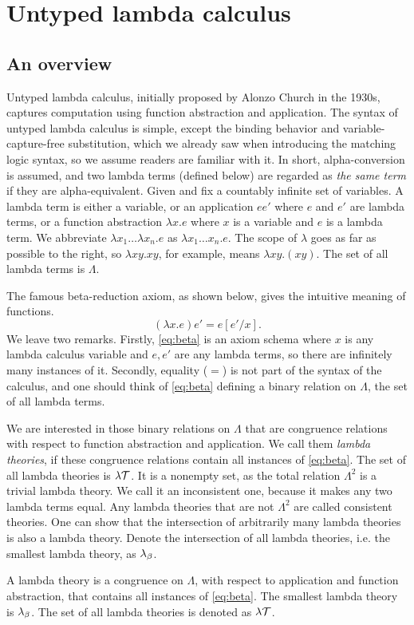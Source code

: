 \section{Untyped lambda calculus}

\subsection{An overview}

Untyped lambda calculus, initially proposed by Alonzo Church in the 1930s,
captures computation using function abstraction and application.
The syntax of untyped lambda calculus is simple,
except the binding behavior and variable-capture-free substitution,
which we already saw when introducing the matching logic syntax,
so we assume readers are familiar with it.
In short, alpha-conversion is assumed, and two lambda terms 
(defined below) are regarded as \emph{the same term} 
if they are alpha-equivalent.
Given and fix a countably infinite set of variables.
A lambda term is either a variable,
or an application $e e'$ where $e$ and $e'$ are lambda terms,
or a function abstraction $\lambda x . e$ 
where $x$ is a variable and $e$ is a lambda term.
We abbreviate $\lambda x_1 \dots \lambda x_n . e$ as
$\lambda x_1 \dots x_n . e$.
The scope of $\lambda$ goes as far as possible to the right,
so $\lambda x y . x y$, for example, means $\lambda x y . (x y)$.
The set of all lambda terms is $\Lambda$.

The famous beta-reduction axiom, as shown below,
gives the intuitive meaning of functions. 
\begin{equation}
\label{eq:beta}
\tag{$\beta$}
(\lambda x . e) e' = e[e'/x].
\end{equation}
We leave two remarks.
Firstly, \eqref{eq:beta} is an axiom schema
where $x$ is any lambda calculus variable
and $e, e'$ are any lambda terms,
so there are infinitely many instances of it.
Secondly, equality ($=$) is not part of the syntax of the calculus,
and one should think of \eqref{eq:beta}
defining a binary relation on $\Lambda$, the set of all lambda terms.

We are interested in those binary relations on $\Lambda$
that are congruence relations with respect to
function abstraction and application.
We call them \emph{lambda theories}, if these congruence relations
contain all instances of \eqref{eq:beta}.
The set of all lambda theories is $\lambda\mathcal{T}$.
It is a nonempty set, 
as the total relation $\Lambda^2$ is a trivial lambda theory.
We call it an inconsistent one, because it makes any two lambda terms equal.
Any lambda theories that are not $\Lambda^2$ are called consistent theories.
One can show that the intersection of arbitrarily many lambda theories
is also a lambda theory.
Denote the intersection of all lambda theories, i.e. the smallest lambda theory,
as $\lambda_\beta$.

A lambda theory is a congruence on $\Lambda$,
with respect to application and function abstraction,
that contains all instances of \eqref{eq:beta}.
The smallest lambda theory is $\lambda_\beta$.
The set of all lambda theories is denoted as $\lambda\mathcal{T}$.

